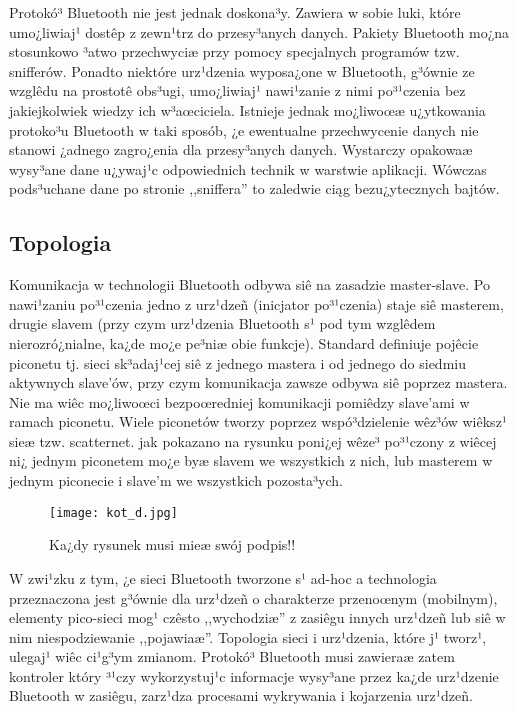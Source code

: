 Protokó³ Bluetooth nie jest jednak doskona³y. Zawiera w sobie luki,
które umo¿liwiaj¹ dostêp  z zewn¹trz do przesy³anych danych. Pakiety
Bluetooth mo¿na stosunkowo ³atwo przechwyciæ przy pomocy
specjalnych programów tzw. snifferów. Ponadto niektóre urz¹dzenia
wyposa¿one w Bluetooth, g³ównie ze wzglêdu na prostotê obs³ugi,
umo¿liwiaj¹ nawi¹zanie z nimi po³¹czenia bez jakiejkolwiek wiedzy
ich w³aœciciela. Istnieje jednak mo¿liwoœæ u¿ytkowania protoko³u
Bluetooth w taki sposób, ¿e ewentualne przechwycenie danych nie
stanowi ¿adnego zagro¿enia dla przesy³anych danych. Wystarczy
opakowaæ wysy³ane dane u¿ywaj¹c odpowiednich technik w warstwie
aplikacji. Wówczas pods³uchane dane po stronie ,,sniffera'' to
zaledwie ciąg bezu¿ytecznych bajtów.
%
\subsection{Topologia}
\label{sec:Mozliwosci} Komunikacja w technologii Bluetooth odbywa
siê na zasadzie master-slave. Po nawi¹zaniu po³¹czenia jedno z
urz¹dzeñ (inicjator po³¹czenia) staje siê masterem, drugie slavem
(przy czym urz¹dzenia Bluetooth s¹ pod tym wzglêdem nierozró¿nialne,
ka¿de mo¿e pe³niæ obie funkcje). Standard definiuje pojêcie piconetu
tj. sieci sk³adaj¹cej siê z jednego mastera i od jednego do siedmiu
aktywnych slave'ów, przy czym komunikacja zawsze odbywa siê poprzez
mastera. Nie ma wiêc mo¿liwoœci bezpoœredniej komunikacji pomiêdzy
slave'ami w ramach piconetu. Wiele piconetów tworzy poprzez
wspó³dzielenie wêz³ów wiêksz¹ sieæ tzw. scatternet. jak pokazano na
rysunku poni¿ej wêze³ po³¹czony z wiêcej ni¿ jednym piconetem mo¿e
byæ slavem we wszystkich z nich, lub masterem w jednym piconecie i
slave'm we wszystkich pozosta³ych.

\begin{figure}[b]
\centering
    \texttt{[image: kot\_d.jpg]}
     \caption{Ka¿dy rysunek musi mieæ swój podpis!!}\label{F_cube}
\end{figure}


W zwi¹zku z tym, ¿e sieci Bluetooth tworzone s¹ ad-hoc a technologia
przeznaczona jest g³ównie dla urz¹dzeñ o charakterze przenoœnym
(mobilnym), elementy pico-sieci mog¹ czêsto ,,wychodziæ'' z zasiêgu
innych urz¹dzeñ lub siê w nim niespodziewanie ,,pojawiaæ''. Topologia
sieci i urz¹dzenia, które j¹ tworz¹, ulegaj¹ wiêc ci¹g³ym zmianom.
Protokó³ Bluetooth musi zawieraæ zatem kontroler  który ³¹czy
wykorzystuj¹c informacje wysy³ane przez ka¿de urz¹dzenie Bluetooth w
zasiêgu, zarz¹dza procesami wykrywania i kojarzenia urz¹dzeñ.
%
